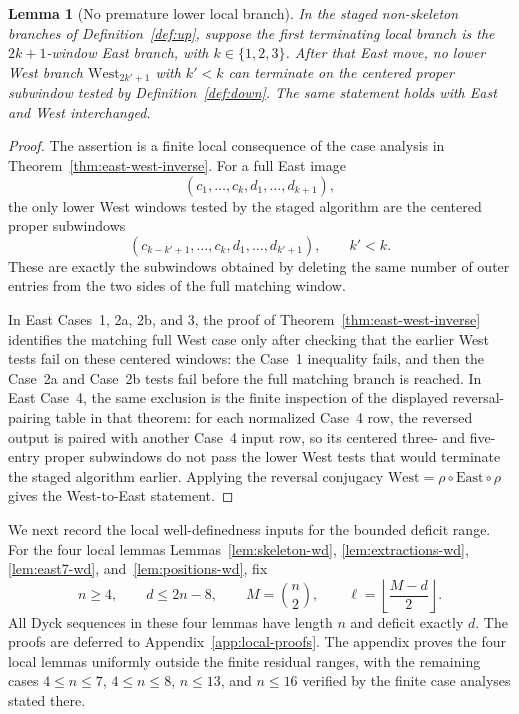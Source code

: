 \documentclass[11pt]{article}
\theoremstyle{plain}
\newtheorem{lemma}[theorem]{Lemma}
\theoremstyle{definition}
\theoremstyle{remark}
\begin{document}
\begin{lemma}[No premature lower local branch]
\label{lem:no-premature-local-branch}
In the staged non-skeleton branches of Definition~\ref{def:up}, suppose the
first terminating local branch is the \(2k+1\)-window East branch, with
\(k\in\{1,2,3\}\).  After that East move, no lower West branch
\(\mathrm{West}_{2k'+1}\) with \(k'<k\) can terminate on the centered proper
subwindow tested by Definition~\ref{def:down}.  The same statement holds with
East and West interchanged.
\end{lemma}

\begin{proof}
The assertion is a finite local consequence of the case analysis in
Theorem~\ref{thm:east-west-inverse}.  For a full East image
\[
  (c_1,\ldots,c_k,d_1,\ldots,d_{k+1}),
\]
the only lower West windows tested by the staged algorithm are the centered
proper subwindows
\[
  (c_{k-k'+1},\ldots,c_k,d_1,\ldots,d_{k'+1}),
  \qquad k'<k.
\]
These are exactly the subwindows obtained by deleting the same number of outer
entries from the two sides of the full matching window.

In East Cases~1, 2a, 2b, and 3, the proof of
Theorem~\ref{thm:east-west-inverse} identifies the matching full West case only
after checking that the earlier West tests fail on these centered windows: the
Case~1 inequality fails, and then the Case~2a and Case~2b tests fail before the
full matching branch is reached.  In East Case~4, the same exclusion is the
finite inspection of the displayed reversal-pairing table in that theorem: for
each normalized Case~4 row, the reversed output is paired with another Case~4
input row, so its centered three- and five-entry proper subwindows do not pass
the lower West tests that would terminate the staged algorithm earlier.
Applying the reversal conjugacy
\(\mathrm{West}=\rho\circ\mathrm{East}\circ\rho\) gives the West-to-East
statement.
\end{proof}

We next record the local well-definedness inputs for the bounded deficit range.
For the four local lemmas
Lemmas~\ref{lem:skeleton-wd}, \ref{lem:extractions-wd},
\ref{lem:east7-wd}, and~\ref{lem:positions-wd}, fix
\[
  n\ge 4,
  \qquad
  d\le 2n-8,
  \qquad
  M=\binom n2,
  \qquad
  \ell=\left\lfloor\frac{M-d}{2}\right\rfloor.
\]
All Dyck sequences in these four lemmas have length \(n\) and deficit exactly
\(d\).  The proofs are deferred to Appendix~\ref{app:local-proofs}.  The
appendix proves the four local lemmas uniformly outside the finite residual
ranges, with the remaining cases \(4\le n\le 7\), \(4\le n\le 8\), \(n\le 13\),
and \(n\le 16\) verified by the finite case analyses stated there.
\end{document}

